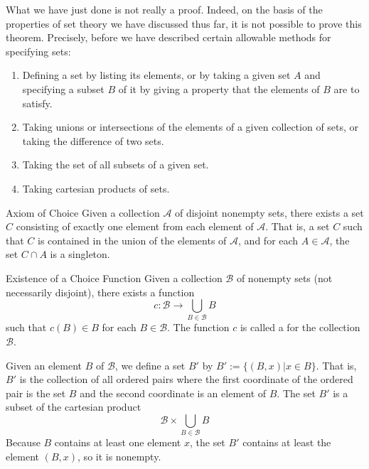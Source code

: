 \documentclass[12pt, a4paper, twoside, openright, titlepage]{book}
\begin{document}
\begin{appendices}
    \begin{rmk}{}{}
        What we have just done is not really a proof. Indeed, on the basis of the properties of set theory we have discussed thus far, it is not possible to prove this theorem. Precisely, before we have described certain allowable methods for specifying sets:\begin{enumerate}
            \item Defining a set by listing its elements, or by taking a given set $A$ and specifying a subset $B$ of it by giving a property that the elements of $B$ are to satisfy.
            \item Taking unions or intersections of the elements of a given collection of sets, or taking the difference of two sets.
            \item Taking the set of all subsets of a given set.
            \item Taking cartesian products of sets.
        \end{enumerate}
    \end{rmk}

    \begin{cust*}[separator sign={}]{Axiom of Choice}{}
        Given a collection $\mathscr{A}$ of disjoint nonempty sets, there exists a set $C$ consisting of exactly one element from each element of $\mathscr{A}$. That is, a set $C$ such that $C$ is contained in the union of the elements of $\mathscr{A}$, and for each $A \in \mathscr{A}$, the set $C\cap A$ is a singleton.
    \end{cust*}

    \begin{lem}{Existence of a Choice Function}{}
        Given a collection $\mathscr{B}$ of nonempty sets (not necessarily disjoint), there exists a function \begin{equation}
            c:\mathscr{B}\rightarrow \bigcup\limits_{B\in\mathscr{B}}B
        \end{equation}
        such that $c(B) \in B$ for each $B \in \mathscr{B}$. The function $c$ is called a  for the collection $\mathscr{B}$.
    \end{lem}
    \begin{proof*}{}{}
        Given an element $B$ of $\mathscr{B}$, we define a set $B'$ by $B' :=\{(B,x)\vert x \in B\}$. That is, $B'$ is the collection of all ordered pairs where the first coordinate of the ordered pair is the set $B$ and the second coordinate is an element of $B$. The set $B'$ is a subset of the cartesian product \begin{equation*}
            \mathscr{B}\times \bigcup\limits_{B\in \mathscr{B}}B
        \end{equation*}
        Because $B$ contains at least one element $x$, the set $B'$ contains at least the element $(B,x)$, so it is nonempty.


\end{proof*}
\end{appendices}
\end{document}
